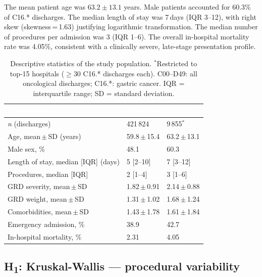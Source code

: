\documentclass[10pt,twocolumn]{article}
\begin{document}
The mean patient age was $63.2 \pm 13.1$ years. Male patients accounted for
60.3\% of C16.* discharges. The median length of stay was 7\,days (IQR 3–12),
with right skew (skewness\,=\,1.63) justifying logarithmic transformation. The
median number of procedures per admission was 3 (IQR 1–6). The overall
in-hospital mortality rate was 4{.}05\%, consistent with a clinically severe,
late-stage presentation profile.

\begin{table}[t]
\small
\begin{tabularx}{\linewidth}{@{}L{4.5cm}R{1.5cm}R{1.5cm}@{}}
\toprule
{}
\textcolor{white}{\textbf{Characteristic}} &
\textcolor{white}{\textbf{C00–D49}} &
\textcolor{white}{\textbf{C16.*}} \\
\midrule
\textit{n} (discharges)                     & 421\,824    & 9\,855$^*$  \\
Age, mean\,$\pm$\,SD (years)                & 59.8\,$\pm$\,15.4 & 63.2\,$\pm$\,13.1 \\
Male sex, \%                                & 48.1        & 60.3       \\
Length of stay, median [IQR] (days)         & 5 [2–10]    & 7 [3–12]   \\
Procedures, median [IQR]                    & 2 [1–4]     & 3 [1–6]    \\
GRD severity, mean\,$\pm$\,SD              & 1.82\,$\pm$\,0.91 & 2.14\,$\pm$\,0.88 \\
GRD weight, mean\,$\pm$\,SD                & 1.31\,$\pm$\,1.02 & 1.68\,$\pm$\,1.24 \\
Comorbidities, mean\,$\pm$\,SD             & 1.43\,$\pm$\,1.78 & 1.61\,$\pm$\,1.84 \\
Emergency admission, \%                     & 38.9        & 42.7       \\
In-hospital mortality, \%                   & 2.31        & 4{.}05     \\
\bottomrule
\end{tabularx}
\caption{Descriptive statistics of the study population. $^*$Restricted to top-15
hospitals ($\geq$30 C16.* discharges each). C00–D49: all oncological discharges;
C16.*: gastric cancer. IQR = interquartile range; SD = standard deviation.}
\label{tab:descriptive}
\end{table}

\subsection{H\textsubscript{1}: Kruskal-Wallis — procedural variability}
\end{document}
